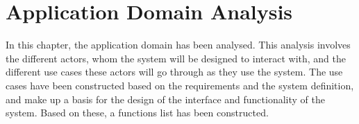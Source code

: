 \chapter{Application Domain Analysis} \label{ch:applicationdomain}
In this chapter, the application domain has been analysed. This analysis involves the different actors, whom the system will be designed to interact with, and the different use cases these actors will go through as they use the system. The use cases have been constructed based on the requirements and the system definition, and make up a basis for the design of the interface and functionality of the system. Based on these, a functions list has been constructed.
